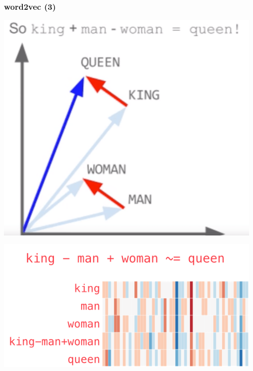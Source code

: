 \documentclass[aspectratio=43,x11names]{beamer}
\begin{document}
\begin{frame}[fragile]
\frametitle{word2vec (3)}

\begin{minipage}{0.49\textwidth}
\begin{center}
\includegraphics[width=\textwidth, keepaspectratio]{images/word2vec-king-queen-math} 
\end{center}
\end{minipage}
\begin{minipage}{0.49\textwidth}
\begin{center}
\includegraphics[width=\textwidth, keepaspectratio]{images/word2vec} 
\end{center}
\end{minipage}
\end{frame}
\end{document}
